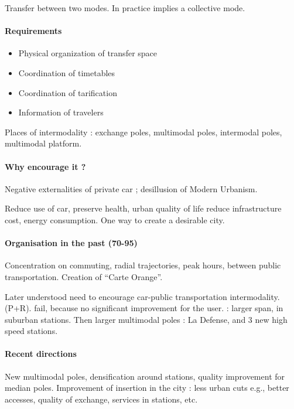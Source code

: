 Transfer between two modes. In practice implies a collective mode.

\paragraph{Requirements}

\begin{itemize}
\item Physical organization of transfer space
\item Coordination of timetables
\item Coordination of tarification
\item Information of travelers
\end{itemize}

Places of intermodality : exchange poles, multimodal poles, intermodal poles, multimodal platform.

\paragraph{Why encourage it ?}

Negative externalities of private car ; desillusion of Modern Urbanism.

Reduce use of car, preserve health, urban quality of life reduce infrastructure cost, energy consumption. One way to create a desirable city.

\paragraph{Organisation in the past (70-95)}

Concentration on commuting, radial trajectories, peak hours, between public transportation. Creation of ``Carte Orange''.

Later understood need to encourage car-public transportation intermodality. (P+R). fail, because no significant improvement for the user. : larger span, in suburban stations. Then larger multimodal poles : La Defense, and 3 new high speed stations.

\paragraph{Recent directions}

New multimodal poles, densification around stations, quality improvement for median poles. Improvement of insertion in the city : less urban cuts e.g., better accesses, quality of exchange, services in stations, etc.

